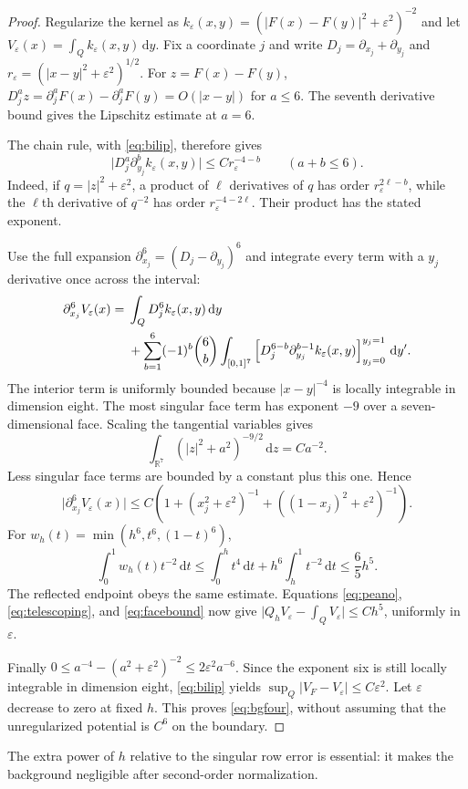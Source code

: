 \documentclass[11pt,a4paper]{article}
\theoremstyle{definition}
\newcommand{\R}{\mathbb R}
\newcommand{\dd}{\,\mathrm d}
\newcommand{\abs}[1]{\lvert#1\rvert}
\newcommand{\eps}{\varepsilon}
\numberwithin{equation}{section}
\begin{document}
\begin{proof}
Regularize the kernel as $k_\eps(x,y)=(\abs{F(x)-F(y)}^2+\eps^2)^{-2}$ and let $V_\eps(x)=\int_Qk_\eps(x,y)\dd y$. Fix a coordinate $j$ and write $D_j=\partial_{x_j}+\partial_{y_j}$ and $r_\eps=(\abs{x-y}^2+\eps^2)^{1/2}$. For $z=F(x)-F(y)$,
$D_j^az=\partial_j^aF(x)-\partial_j^aF(y)=O(\abs{x-y})$ for $a\le6$. The seventh derivative bound gives the Lipschitz estimate at $a=6$.

The chain rule, with \eqref{eq:bilip}, therefore gives
\begin{equation}\label{eq:simderiv}
 \abs{D_j^a\partial_{y_j}^bk_\eps(x,y)}
       \le C r_\eps^{-4-b}\qquad(a+b\le6).
\end{equation}
Indeed, if $q=\abs z^2+\eps^2$, a product of $\ell$ derivatives of $q$ has order $r_\eps^{2\ell-b}$, while the $\ell$th derivative of $q^{-2}$ has order $r_\eps^{-4-2\ell}$. Their product has the stated exponent.

Use the full expansion $\partial_{x_j}^6=(D_j-\partial_{y_j})^6$ and integrate every term with a $y_j$ derivative once across the interval:
\begin{align}\label{eq:faces}
 \partial_{x_j}^6V_\eps(x)
 ={}&\int_QD_j^6k_\eps(x,y)\dd y\\
 &+\sum_{b=1}^6(-1)^b\binom6b
 \int_{[0,1]^7}\left[D_j^{6-b}\partial_{y_j}^{b-1}k_\eps(x,y)
              \right]_{y_j=0}^{y_j=1}\dd y'.\notag
\end{align}
The interior term is uniformly bounded because $\abs{x-y}^{-4}$ is locally integrable in dimension eight. The most singular face term has exponent $-9$ over a seven-dimensional face. Scaling the tangential variables gives
\[
 \int_{\R^7}(\abs z^2+a^2)^{-9/2}\dd z=C a^{-2}.
\]
Less singular face terms are bounded by a constant plus this one. Hence
\begin{equation}\label{eq:facebound}
 \abs{\partial_{x_j}^6V_\eps(x)}
 \le C\left(1+(x_j^2+\eps^2)^{-1}
              +((1-x_j)^2+\eps^2)^{-1}\right).
\end{equation}
For $w_h(t)=\min(h^6,t^6,(1-t)^6)$,
\begin{equation}
 \int_0^1w_h(t)t^{-2}\dd t
 \le\int_0^ht^4\dd t+h^6\int_h^1t^{-2}\dd t\le\frac65h^5.
\end{equation}
The reflected endpoint obeys the same estimate. Equations \eqref{eq:peano}, \eqref{eq:telescoping}, and \eqref{eq:facebound} now give
$\abs{Q_hV_\eps-\int_QV_\eps}\le Ch^5$, uniformly in $\eps$.

Finally $0\le a^{-4}-(a^2+\eps^2)^{-2}\le2\eps^2a^{-6}$. Since the exponent six is still locally integrable in dimension eight, \eqref{eq:bilip} yields $\sup_Q\abs{V_F-V_\eps}\le C\eps^2$. Let $\eps$ decrease to zero at fixed $h$. This proves \eqref{eq:bgfour}, without assuming that the unregularized potential is $C^6$ on the boundary.
\end{proof}
The extra power of $h$ relative to the singular row error is essential: it makes the background negligible after second-order normalization.
\end{document}
